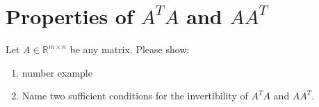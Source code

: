 \section{Properties of $A^TA$ and $AA^T$}
Let $A \in  \mathbb{R}^{m \times n}$ be any matrix. Please show:
\begin{enumerate}
	\item number example
	\item Name two sufficient conditions for the invertibility of $A^TA$ and $AA^T$.
\end{enumerate}
